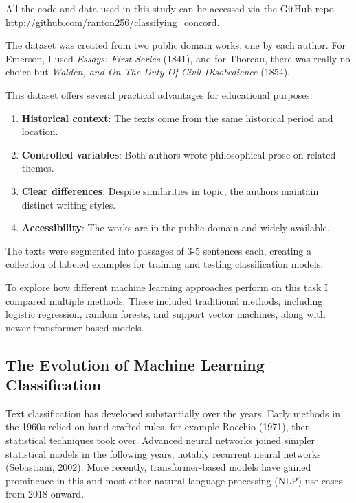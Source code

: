 \documentclass[
]{article}
\begin{document}
All the code and data used in this study can be accessed via the GitHub
repo
\href{github.com/ranton256/classifying_concord}{http://github.com/ranton256/classifying\_concord}.

The dataset was created from two public domain works, one by each
author. For Emerson, I used \emph{Essays: First Series} (1841), and for
Thoreau, there was really no choice but \emph{Walden, and On The Duty Of
Civil Disobedience} (1854).

This dataset offers several practical advantages for educational
purposes:

\begin{enumerate}
\def\labelenumi{\arabic{enumi}.}
\item
  \textbf{Historical context}: The texts come from the same historical
  period and location.
\item
  \textbf{Controlled variables}: Both authors wrote philosophical prose
  on related themes.
\item
  \textbf{Clear differences}: Despite similarities in topic, the authors
  maintain distinct writing styles.
\item
  \textbf{Accessibility}: The works are in the public domain and widely
  available.
\end{enumerate}

The texts were segmented into passages of 3-5 sentences each, creating a
collection of labeled examples for training and testing classification
models.

To explore how different machine learning approaches perform on this
task I compared multiple methods. These included traditional methods,
including logistic regression, random forests, and support vector
machines, along with newer transformer-based models.

\subsection{The Evolution of Machine Learning
Classification}\label{the-evolution-of-machine-learning-classification}

Text classification has developed substantially over the years. Early
methods in the 1960s relied on hand-crafted rules, for example Rocchio
(1971), then statistical techniques took over. Advanced neural networks
joined simpler statistical models in the following years, notably
recurrent neural networks (Sebastiani, 2002). More recently,
transformer-based models have gained prominence in this and most other
natural language processing (NLP) use cases from 2018 onward.
\end{document}
